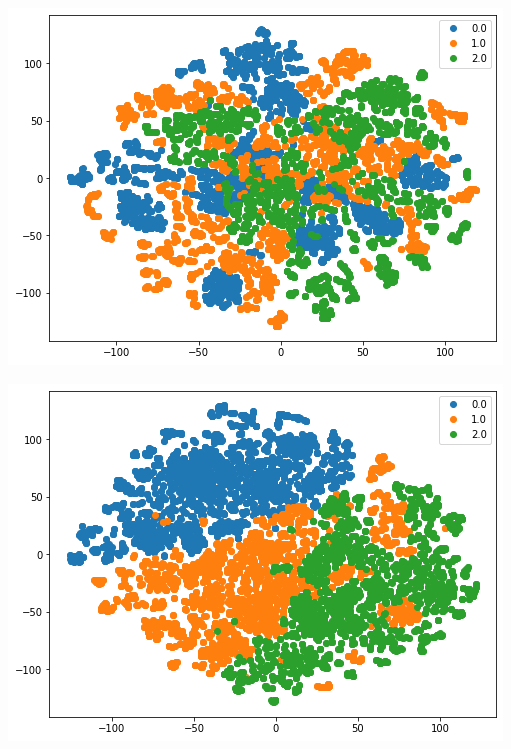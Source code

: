 \documentclass[11pt]{article}
\begin{document}
\begin{center}
    \begin{minipage}{0.48\linewidth}
    \includegraphics[width=\linewidth]{output_squeezeNet_v2_0epoch.png}
    \end{minipage}%
    \begin{minipage}{0.49\linewidth}
    \includegraphics[width=\linewidth]{output_squeezeNet_v2_30epoch.png}
    \end{minipage}
\end{center}
\end{document}
